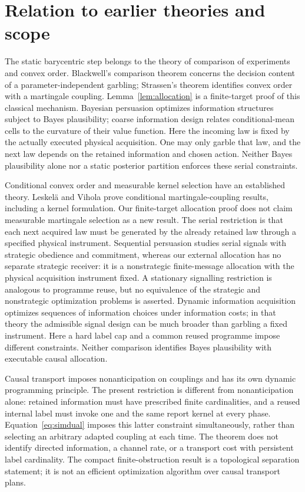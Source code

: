 \section{Relation to earlier theories and scope}\label{sec:literature}
The static barycentric step belongs to the theory of comparison of experiments and convex order. Blackwell's comparison theorem\cite{blackwell} concerns the decision content of a parameter-independent garbling; Strassen's theorem\cite{strassen} identifies convex order with a martingale coupling. Lemma~\ref{lem:allocation} is a finite-target proof of this classical mechanism. Bayesian persuasion\cite{kamenica} optimizes information structures subject to Bayes plausibility; coarse information design\cite{lyu} relates conditional-mean cells to the curvature of their value function. Here the incoming law is fixed by the actually executed physical acquisition. One may only garble that law, and the next law depends on the retained information and chosen action. Neither Bayes plausibility alone nor a static posterior partition enforces these serial constraints.

Conditional convex order and measurable kernel selection have an established theory. Leskel\"a and Vihola\cite{leskela} prove conditional martingale-coupling results, including a kernel formulation. Our finite-target allocation proof does not claim measurable martingale selection as a new result. The serial restriction is that each next acquired law must be generated by the already retained law through a specified physical instrument. Sequential persuasion\cite{gan} studies serial signals with strategic obedience and commitment, whereas our external allocation has no separate strategic receiver: it is a nonstrategic finite-message allocation with the physical acquisition instrument fixed. A stationary signalling restriction is analogous to programme reuse, but no equivalence of the strategic and nonstrategic optimization problems is asserted. Dynamic information acquisition\cite{zhong} optimizes sequences of information choices under information costs; in that theory the admissible signal design can be much broader than garbling a fixed instrument. Here a hard label cap and a common reused programme impose different constraints. Neither comparison identifies Bayes plausibility with executable causal allocation.

Causal transport\cite{backhoff} imposes nonanticipation on couplings and has its own dynamic programming principle. The present restriction is different from nonanticipation alone: retained information must have prescribed finite cardinalities, and a reused internal label must invoke one and the same report kernel at every phase. Equation~\eqref{eq:simdual} imposes this latter constraint simultaneously, rather than selecting an arbitrary adapted coupling at each time. The theorem does not identify directed information, a channel rate, or a transport cost with persistent label cardinality. The compact finite-obstruction result is a topological separation statement; it is not an efficient optimization algorithm over causal transport plans.

